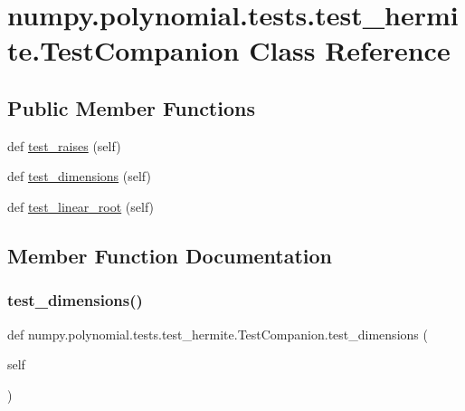 \hypertarget{classnumpy_1_1polynomial_1_1tests_1_1test__hermite_1_1TestCompanion}{}\section{numpy.\+polynomial.\+tests.\+test\+\_\+hermite.\+Test\+Companion Class Reference}
\label{classnumpy_1_1polynomial_1_1tests_1_1test__hermite_1_1TestCompanion}
\subsection*{Public Member Functions}
\begin{DoxyCompactItemize}
\item 
def \hyperlink{classnumpy_1_1polynomial_1_1tests_1_1test__hermite_1_1TestCompanion_a4d4821eb46554392eb72f442a2e06036}{test\+\_\+raises} (self)
\item 
def \hyperlink{classnumpy_1_1polynomial_1_1tests_1_1test__hermite_1_1TestCompanion_aae4e0f17199e303b3c941acfc24d35aa}{test\+\_\+dimensions} (self)
\item 
def \hyperlink{classnumpy_1_1polynomial_1_1tests_1_1test__hermite_1_1TestCompanion_ad25af2a5eb53c51d89d7a1a43e1f738e}{test\+\_\+linear\+\_\+root} (self)
\end{DoxyCompactItemize}


\subsection{Member Function Documentation}
\mbox{\label{classnumpy_1_1polynomial_1_1tests_1_1test__hermite_1_1TestCompanion_aae4e0f17199e303b3c941acfc24d35aa}} 
\subsubsection{\texorpdfstring{test\+\_\+dimensions()}{test\_dimensions()}}
{\footnotesize\ttfamily def numpy.\+polynomial.\+tests.\+test\+\_\+hermite.\+Test\+Companion.\+test\+\_\+dimensions (\begin{DoxyParamCaption}\item[{}]{self }\end{DoxyParamCaption})}

